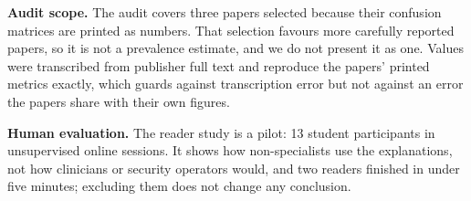 \noindent\textbf{Audit scope.} The audit covers three papers selected because their confusion matrices are printed as numbers. That selection favours more carefully reported papers, so it is not a prevalence estimate, and we do not present it as one. Values were transcribed from publisher full text and reproduce the papers' printed metrics exactly, which guards against transcription error but not against an error the papers share with their own figures.

\noindent\textbf{Human evaluation.} The reader study is a pilot: 13 student participants in unsupervised online sessions. It shows how non-specialists use the explanations, not how clinicians or security operators would, and two readers finished in under five minutes; excluding them does not change any conclusion.
